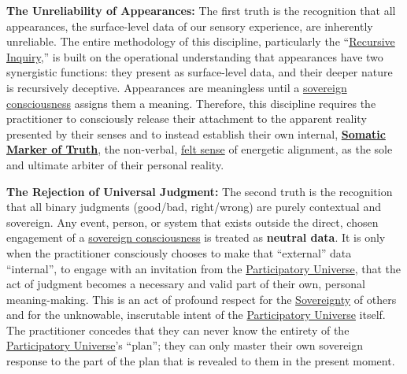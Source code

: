 \documentclass{article}
\begin{document}
\begin{description}
    \item \textbf{The Unreliability of Appearances:} The first truth is the recognition that all appearances, the surface-level data of our sensory experience, are inherently unreliable. The entire methodology of this discipline, particularly the ``\hyperlink{gloss:recursive_inquiry}{Recursive Inquiry},'' is built on the operational understanding that appearances have two synergistic functions: they present as surface-level data, and their deeper nature is recursively deceptive. Appearances are meaningless until a \hyperlink{gloss:sovereign_consciousness}{sovereign consciousness} assigns them a meaning. Therefore, this discipline requires the practitioner to consciously release their attachment to the apparent reality presented by their senses and to instead establish their own internal, \textbf{\hyperlink{gloss:somatic_marker_of_truth}{Somatic Marker of Truth}}, the non-verbal, \hyperlink{gloss:felt_sense}{felt sense} of energetic alignment, as the sole and ultimate arbiter of their personal reality.

    \item \textbf{The Rejection of Universal Judgment:} The second truth is the recognition that all binary judgments (good/bad, right/wrong) are purely contextual and sovereign. Any event, person, or system that exists outside the direct, chosen engagement of a \hyperlink{gloss:sovereign_consciousness}{sovereign consciousness} is treated as \textbf{neutral data}. It is only when the practitioner consciously chooses to make that ``external'' data ``internal'', to engage with an invitation from the \hyperlink{gloss:participatory_universe}{Participatory Universe}, that the act of judgment becomes a necessary and valid part of their own, personal meaning-making. This is an act of profound respect for the \hyperlink{gloss:sovereignty}{Sovereignty} of others and for the unknowable, inscrutable intent of the \hyperlink{gloss:participatory_universe}{Participatory Universe} itself. The practitioner concedes that they can never know the entirety of the \hyperlink{gloss:participatory_universe}{Participatory Universe}'s ``plan''; they can only master their own sovereign response to the part of the plan that is revealed to them in the present moment.
\end{description}
\end{document}
